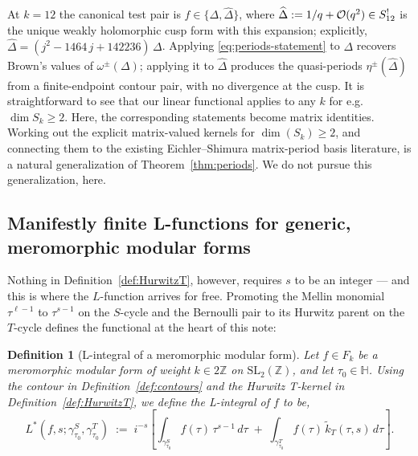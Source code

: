 \documentclass[11pt]{article}
\newtheorem{definition}[theorem]{Definition}
\numberwithin{equation}{section}  %
\newcommand{\HH}{\mathbb{H}}
\newcommand{\ZZ}{\mathbb{Z}}
\newcommand{\SLZ}{\mathrm{SL}_2(\ZZ)}
\newcommand{\Dhat}{\widehat{\Delta}}
\begin{document}
At $k = 12$ the canonical test pair is $f \in \{\Delta, \Dhat\}$, where
$\Dhat := 1/q + {\cal O}(q^2) \in S^!_{12}$ is the unique weakly
holomorphic cusp form with this expansion; explicitly,
$\Dhat = (j^2 - 1464\,j + 142236)\,\Delta$. %
Applying \eqref{eq:periods-statement} to $\Delta$ recovers Brown's values
of $\omega^\pm(\Delta)$; applying it to $\Dhat$ produces the quasi-periods
$\eta^\pm(\Dhat)$ from a finite-endpoint contour pair, with no divergence
at the cusp.  It is straightforward to see that our linear functional
applies to any $k$ for e.g. $\dim S_k \ge 2$.  Here, the corresponding
statements become matrix identities.  Working out the explicit
matrix-valued kernels for $\dim(S_k) \ge 2$, and connecting them to the
existing Eichler--Shimura matrix-period basis literature, is a natural
generalization of Theorem~\ref{thm:periods}. We do not pursue this
generalization, here.

\subsection{Manifestly finite L-functions for generic, meromorphic modular forms}

Nothing in Definition~\ref{def:HurwitzT}, however, requires $s$ to be an
integer --- and this is where the $L$-function arrives for free.
Promoting the Mellin monomial $\tau^{\ell - 1}$ to $\tau^{s - 1}$ on the
$S$-cycle and the Bernoulli pair to its Hurwitz parent on the $T$-cycle
defines the functional at the heart of this note:

\begin{definition}[L-integral of a meromorphic modular form]\label{def:L-integral}
Let $f \in F_k$ be a meromorphic modular form of weight $k \in 2\ZZ$ on $\SLZ$, and let $\tau_0 \in \HH$. Using the contour in Definition~\ref{def:contours} and the Hurwitz T-kernel in Definition~\ref{def:HurwitzT}, we define the \emph{L-integral} of $f$ to be,
\begin{equation}\label{eq:Lambda-DR-def}
  L^*(f, s; \gamma^S_{\tau_0}
  , \gamma^T_{\tau_0})
  \;:=\; i^{-s}\!\left[
    \int_{\gamma^S_{\tau_0}}
    \! f(\tau)\,\tau^{s-1}\,d\tau
    \;+\;
    \int_{\gamma^T_{\tau_0}}
    f(\tau)\,\widetilde{k}_T(\tau, s)\,d\tau
  \right].
\end{equation}
\end{definition}
\end{document}
